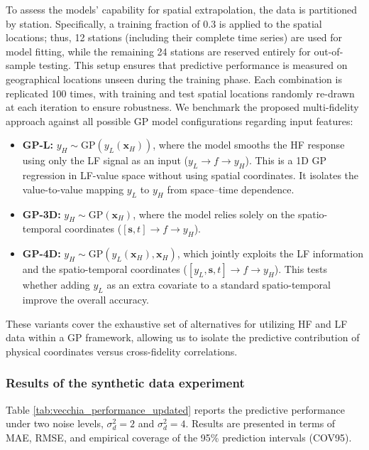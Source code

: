 \documentclass[12pt]{article}
\begin{document}
\noindent
\hangindent=-5mm
To assess the models' capability for spatial extrapolation, the data is partitioned by station. Specifically, a training fraction of $0.3$ is applied to the spatial locations; thus, 12 stations (including their complete time series) are used for model fitting, while the remaining 24 stations are reserved entirely for out-of-sample testing. This setup ensures that predictive performance is measured on geographical locations unseen during the training phase.
 Each combination is replicated 100 times, with training and test spatial locations randomly re-drawn at each iteration to ensure robustness. We benchmark the proposed multi-fidelity approach against all possible GP model configurations regarding input features:
\begin{itemize}
    \item \textbf{GP-L:} $y_H \sim \mathrm{GP}(y_L(\bm{x}_H))$, where the model smooths the HF response using only the LF signal as an input ($y_L \rightarrow f \rightarrow y_H$). This is a 1D GP regression in LF-value space without using spatial coordinates. It isolates the value-to-value mapping $y_L$ to $y_H$ from space–time dependence. 
    \item \textbf{GP-3D:} $y_H \sim \mathrm{GP}(\bm{x}_H)$, where the model relies solely on the spatio-temporal coordinates ($[\bm{s}, t] \rightarrow f \rightarrow y_H$).
    \item \textbf{GP-4D:} $y_H \sim \mathrm{GP}(y_L(\bm{x}_H), \bm{x}_H)$, which jointly exploits the LF information and the spatio-temporal coordinates ($[y_L, \bm{s}, t] \rightarrow f \rightarrow y_H$). This tests whether adding $y_L$ as an extra covariate to a standard spatio-temporal improve the overall accuracy.
\end{itemize}
These variants cover the exhaustive set of alternatives for utilizing HF and LF data within a GP framework, allowing us to isolate the predictive contribution of physical coordinates versus cross-fidelity correlations. 

\subsubsection{Results of the synthetic data experiment} \label{result_synthetic}

Table \ref{tab:vecchia_performance_updated} reports the predictive performance under two noise levels, $\sigma_d^2 = 2$ and $\sigma_d^2 = 4$. Results are presented in terms of MAE, RMSE, and empirical coverage of the 95\% prediction intervals (COV95).
\end{document}

